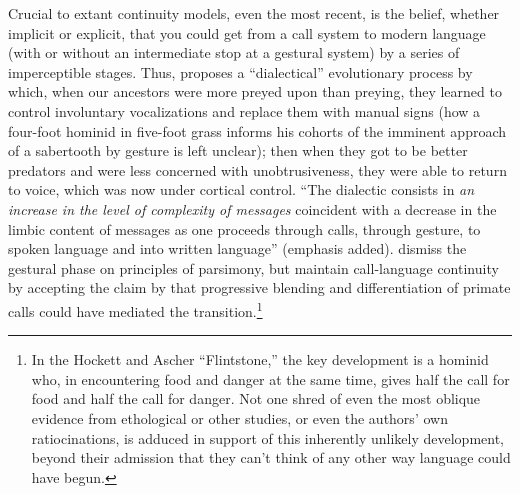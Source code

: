 Crucial to extant continuity models, even the most recent, is
the belief, whether implicit or explicit, that you could get from a call system to modern language (with or without an intermediate stop at a gestural system) by a series of imperceptible stages. Thus, \citet{Stephenson1979} proposes a ``dialectical'' evolutionary process by which, when our ancestors were more preyed upon than preying, they learned to control involuntary vocalizations and replace them with manual signs (how a four-foot hominid in five-foot grass informs his cohorts of the imminent approach of a sabertooth by gesture is left unclear); then when they got to be better predators and were less concerned with unobtrusiveness, they were able to return to voice, which was now under cortical control. ``The dialectic consists in \textit{an increase in the level of complexity of messages} coincident with a decrease in the limbic content of messages as one proceeds through calls, through gesture, to spoken language and into written language'' (emphasis added). \citet{SteklisEtAl1979} dismiss the gestural phase on principles of parsimony, but maintain call-language continuity by accepting the claim by \citet{HockettEtAl1964} that progressive blending and differentiation of primate calls could have mediated the transition.\footnote{In the Hockett and Ascher ``Flintstone,'' the key development is a hominid who, in encountering food and danger at the same time, gives half the call for food and half the call for danger. Not one shred of even the most oblique evidence from ethological or other studies, or even the authors' own ratiocinations, is adduced in support of this inherently unlikely development, beyond their admission that they can't think of any other way language could have begun.}

